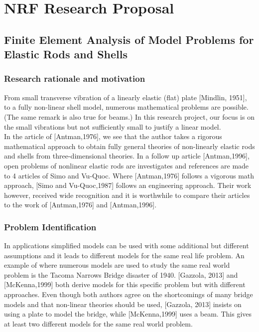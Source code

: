 \documentclass[../../main.tex]{subfiles}
\begin{document}
\setcounter{chapter}{1}
\setcounter{section}{1}
\section{NRF Research Proposal}
\subsection*{Finite Element Analysis of Model Problems for Elastic Rods and Shells}
\subsubsection*{Research rationale and motivation}
From small transverse vibration of a linearly elastic (flat) plate [Mindlin, 1951], to a fully non-linear shell model, numerous mathematical problems are possible. (The same remark is also true for beams.) In this research project, our focus is on the small vibrations but not sufficiently small to justify a linear model.\\

In the article of [Antman,1976], we see that the author takes a rigorous mathematical approach to obtain fully general theories of non-linearly elastic rods and shells from three-dimensional theories. In a follow up article [Antman,1996], open problems of nonlinear elastic rods are investigates and references are made to 4 articles of Simo and Vu-Quoc. Where [Antman,1976] follows a vigorous math approach, [Simo and Vu-Quoc,1987] follows an engineering approach. Their work however, received wide recognition and it is worthwhile to compare their articles to the work of [Antman,1976] and [Antman,1996].\\

\subsubsection*{Problem Identification}
In applications simplified models can be used with some additional but different assumptions and it leads to different models for the same real life problem. An example of where numerous models are used to study the same real world problem is the Tacoma Narrows Bridge disaster of 1940. [Gazzola, 2013] and [McKenna,1999] both derive models for this specific problem but with different approaches. Even though both authors agree on the shortcomings of many bridge models and that non-linear theories should be used, [Gazzola, 2013] insists on using a plate to model the bridge, while [McKenna,1999] uses a beam. This gives at least two different models for the same real world problem.\\
\end{document}
